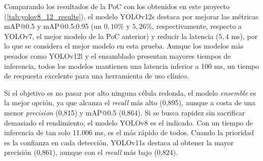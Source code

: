 \documentclass[12pt,a4paper,onecolumn,oneside]{report}
\begin{document}
\begin{table}[H]
  \caption{Resultados de los modelos sobre el conjunto de \textit{test} original}
  \centering
  \label{tab:yolov8_12_results}
\end{table}

Comparando los resultados de la PoC con los obtenidos en este proyecto (\autoref{tab:yolov8_12_results}), el modelo YOLOv12s destaca por mejorar las métricas mAP@0.5 y mAP@0.5:0.95 (un $0,10\%$ y $5,26\%$, respectivamente, respecto a YOLOv7, el mejor modelo de la PoC anterior) y 
reducir la latencia ($5,4$ ms), por lo que se considera el mejor modelo en esta prueba. Aunque los modelos más pesados como YOLOv12l y el ensamblado 
presentan mayores tiempos de inferencia, todos los modelos mantienen una latencia inferior a 100 ms, un tiempo de respuesta excelente para una herramienta de uso clínico. 

Si el objetivo es no pasar por alto ninguna célula redonda, el modelo \textit{ensemble} es la mejor opción, ya que alcanza el \textit{recall} más alto (0,895),
aunque a costa de una menor \textit{precision} (0,815) y mAP@0.5 (0,864). Si se busca rapidez sin sacrificar demasiado el rendimiento, el modelo YOLOv8 es el indicado. Con un tiempo de inferencia de tan solo 11.006 ms, es el más rápido de todos.
Cuando la prioridad es la confianza en cada detección, YOLOv11s destaca al obtener la mayor precisión (0,861), aunque con el \textit{recall} más bajo (0,824).
\end{document}
